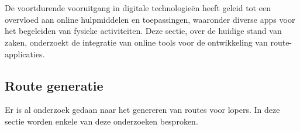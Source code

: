\chapter{}%
\label{ch:stand-van-zaken}



De voortdurende vooruitgang in digitale technologieën heeft geleid tot een overvloed aan online hulpmiddelen en toepassingen,
waaronder diverse apps voor het begeleiden van fysieke activiteiten.
Deze sectie, over de huidige stand van zaken, onderzoekt de integratie van online tools voor de ontwikkeling van route-applicaties.

    \section{Route generatie}

    Er is al onderzoek gedaan naar het genereren van routes voor lopers. In deze sectie worden enkele van deze onderzoeken besproken.
    

